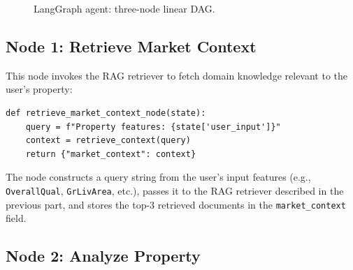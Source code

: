 \documentclass[11pt,a4paper]{article}
\begin{document}
\begin{figure}[H]
\centering
{}
\caption{LangGraph agent: three-node linear DAG.}
\label{fig:graph-topo}
\end{figure}

\subsection{Node 1: Retrieve Market Context}

This node invokes the RAG retriever to fetch domain knowledge relevant to the user's property:

\begin{lstlisting}[caption={Retrieve market context node.}]
def retrieve_market_context_node(state):
    query = f"Property features: {state['user_input']}"
    context = retrieve_context(query)
    return {"market_context": context}
\end{lstlisting}

The node constructs a query string from the user's input features (e.g., \texttt{OverallQual}, \texttt{GrLivArea}, etc.), passes it to the RAG retriever described in the previous part, and stores the top-3 retrieved documents in the \texttt{market\_context} field.

\subsection{Node 2: Analyze Property}
\end{document}
